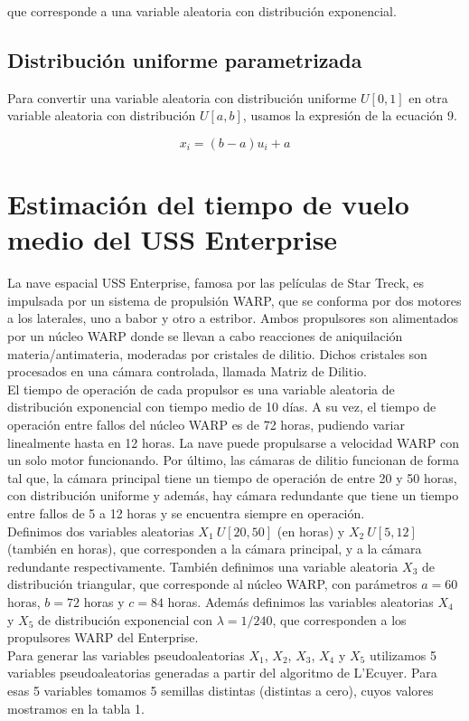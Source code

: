 \documentclass[10pt,journal,compsoc]{IEEEtran}
\begin{document}
que corresponde a una variable aleatoria con distribuci\'on exponencial.

\subsection{Distribuci\'on uniforme parametrizada}
Para convertir una variable aleatoria con distribuci\'on uniforme $U[0,1]$ en otra variable aleatoria con distribuci\'on
$U[a, b]$, usamos la expresi\'on de la ecuaci\'on 9.

\begin{equation}
 x_i = (b-a)u_i + a
\end{equation}

\section{Estimaci\'on del tiempo de vuelo medio del USS Enterprise}
La nave espacial USS Enterprise, famosa por las pel\'iculas de Star Treck, es impulsada por un sistema de propulsi\'on WARP, 
que se conforma por dos motores a los laterales, uno a babor y otro a estribor. Ambos propulsores son alimentados por un n\'ucleo WARP
donde se llevan a cabo reacciones de aniquilaci\'on materia/antimateria, moderadas por cristales de dilitio. Dichos cristales 
son procesados en una c\'amara controlada, llamada Matriz de Dilitio.\\
\indent El tiempo de operaci\'on de cada propulsor es una variable aleatoria de distribuci\'on exponencial con tiempo medio de 10 d\'ias. 
A su vez, el tiempo de operaci\'on entre fallos del n\'ucleo WARP es de 72 horas, pudiendo variar linealmente hasta en 12 horas. 
La nave puede propulsarse a velocidad WARP con un solo motor funcionando. Por \'ultimo, las c\'amaras de dilitio funcionan de forma tal que, la c\'amara principal tiene un tiempo de operaci\'on de entre 
20 y 50 horas, con distribuci\'on uniforme y adem\'as, hay c\'amara redundante que tiene un tiempo entre fallos de 5 a 12 horas y se encuentra siempre en 
operaci\'on.\\

\indent Definimos dos variables aleatorias  $X_1~U[20,50]$ (en horas) y $X_2~U[5, 12]$ (tambi\'en en horas), que corresponden a la c\'amara principal, y a la c\'amara redundante respectivamente. Tambi\'en definimos una variable aleatoria $X_3$ de distribuci\'on 
triangular, que corresponde al n\'ucleo WARP, con par\'ametros $a = 60$ horas, $b = 72$ horas y $c = 84$ horas. Adem\'as
definimos las variables aleatorias $X_4$ y $X_5$ de distribuci\'on exponencial con $\lambda=1/240$, que corresponden a los propulsores WARP del Enterprise.\\
\indent Para generar las variables pseudoaleatorias $X_1$, $X_2$, $X_3$, $X_4$ y $X_5$ utilizamos 5 variables pseudoaleatorias generadas
a partir del algoritmo de L'Ecuyer.  Para esas 5 variables tomamos 5 semillas distintas (distintas a cero), cuyos valores mostramos en la tabla 1.
\end{document}
